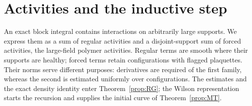 \section{Activities and the inductive step}\label{sec:partII-D}

An exact block integral contains interactions on arbitrarily large supports. We express them as a sum of regular activities and a disjoint-support sum of forced activities, the large-field polymer activities. Regular terms are smooth where their supports are healthy; forced terms retain configurations with flagged plaquettes. Their norms serve different purposes: derivatives are required of the first family, whereas the second is estimated uniformly over configurations. The estimates and the exact density identity enter Theorem~\ref{prop:RG}; the Wilson representation starts the recursion and supplies the initial curve of Theorem~\ref{prop:MT}.

